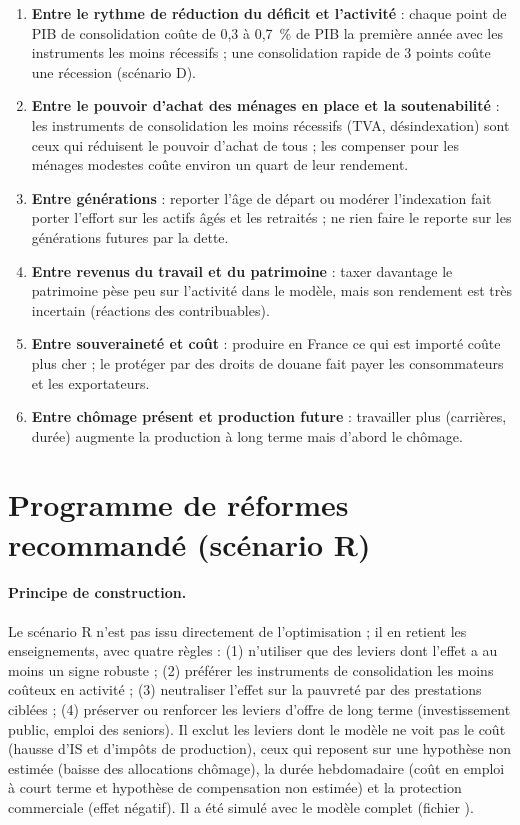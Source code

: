 \begin{enumerate}
\item \textbf{Entre le rythme de réduction du déficit et l'activité} : chaque point de PIB de consolidation coûte de 0,3 à
0,7~\% de PIB la première année avec les instruments les moins récessifs ; une consolidation rapide de 3 points coûte une
récession (scénario D).
\item \textbf{Entre le pouvoir d'achat des ménages en place et la soutenabilité} : les instruments de consolidation les
moins récessifs (TVA, désindexation) sont ceux qui réduisent le pouvoir d'achat de tous ; les compenser pour les ménages
modestes coûte environ un quart de leur rendement.
\item \textbf{Entre générations} : reporter l'âge de départ ou modérer l'indexation fait porter l'effort sur les actifs âgés
et les retraités ; ne rien faire le reporte sur les générations futures par la dette.
\item \textbf{Entre revenus du travail et du patrimoine} : taxer davantage le patrimoine pèse peu sur l'activité dans le
modèle, mais son rendement est très incertain (réactions des contribuables).
\item \textbf{Entre souveraineté et coût} : produire en France ce qui est importé coûte plus cher ; le protéger par des
droits de douane fait payer les consommateurs et les exportateurs.
\item \textbf{Entre chômage présent et production future} : travailler plus (carrières, durée) augmente la production à
long terme mais d'abord le chômage.
\end{enumerate}

\section{Programme de réformes recommandé (scénario R)}

\paragraph{Principe de construction.} Le scénario R n'est pas issu directement de l'optimisation ; il en retient les
enseignements, avec quatre règles : (1) n'utiliser que des leviers dont l'effet a au moins un signe robuste ; (2) préférer
les instruments de consolidation les moins coûteux en activité ; (3) neutraliser l'effet sur la pauvreté par des
prestations ciblées ; (4) préserver ou renforcer les leviers d'offre de long terme (investissement public, emploi des
seniors). Il exclut les leviers dont le modèle ne voit pas le coût (hausse d'IS et d'impôts de production), ceux qui
reposent sur une hypothèse non estimée (baisse des allocations chômage), la durée hebdomadaire (coût en emploi à court
terme et hypothèse de compensation non estimée) et la protection commerciale (effet négatif). Il a été simulé avec le
modèle complet (fichier ).

